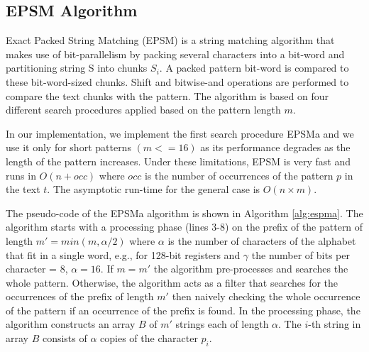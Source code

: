 \subsection{EPSM Algorithm}
Exact Packed String Matching (EPSM) \cite{epsm} is a string matching algorithm that makes use of bit-parallelism by packing several characters into a bit-word and partitioning string S into chunks $S_i$. A packed pattern bit-word is compared to these bit-word-sized chunks. Shift and bitwise-and operations are performed to compare the text chunks with the pattern. The algorithm is based on four different search procedures applied based on the pattern length $m$. 

In our implementation, we implement the first search procedure EPSMa and we use it only for short patterns $(m <= 16)$ as its performance degrades as the length of the pattern increases. Under these limitations, EPSM is very fast and runs in $O(n + occ)$ where $occ$ is the number of occurrences of the pattern $p$ in the text $t$. The asymptotic run-time for the general case is $O(n \times m)$.

The pseudo-code of the EPSMa algorithm is shown in Algorithm \ref{alg:espma}. The algorithm starts with a processing phase (lines 3-8) on the prefix of the pattern of length $m' = min(m, \alpha/2)$ where $\alpha$ is the number of characters of the alphabet that fit in a single word, e.g., for 128-bit registers and $\gamma$ the number of bits per character = 8, $\alpha = 16$. If $m = m'$ the algorithm pre-processes and searches the whole pattern. Otherwise, the algorithm acts as a filter that searches for the occurrences of the prefix of length $m'$ then naively checking the whole occurrence of the pattern if an occurrence of the prefix is found. In the processing phase, the algorithm constructs an array $B$ of $m'$ strings each of length $\alpha$. The $i$-th string in array $B$ consists of $\alpha$ copies of the character $p_i$.

